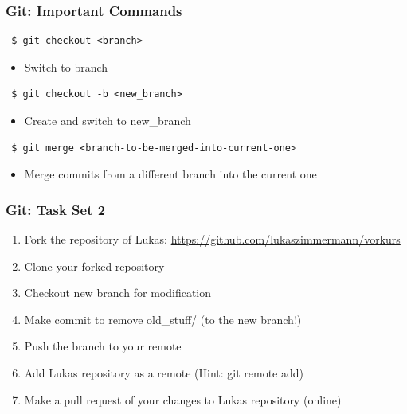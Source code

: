 \documentclass{beamer} %
\begin{document}
\begin{frame}[t, fragile]
\frametitle{Git: Important Commands}

\begin{verbatim} 
 $ git checkout <branch>
\end{verbatim}

\begin{itemize}
	\item Switch to branch 
\end{itemize}


\begin{verbatim} 
 $ git checkout -b <new_branch>
\end{verbatim}

\begin{itemize}
	\item Create and switch to new\_branch 
\end{itemize}

\begin{verbatim} 
 $ git merge <branch-to-be-merged-into-current-one>
\end{verbatim}

\begin{itemize}
	\item Merge commits from a different branch into the current one
\end{itemize}

\end{frame}

\begin{frame}[t, fragile]
\frametitle{Git: Task Set 2}

\begin{enumerate}
	\item Fork the repository of Lukas:   \url{https://github.com/lukaszimmermann/vorkurs}
    \item Clone your forked repository
    \item Checkout new branch for modification
    \item Make commit to remove old\_stuff/ (to the new branch!)
    \item Push the branch to your remote
    \item Add Lukas repository as a remote (Hint: git remote add)
    \item Make a pull request of your changes to Lukas repository (online)
\end{enumerate}

\end{frame}
\end{document}
